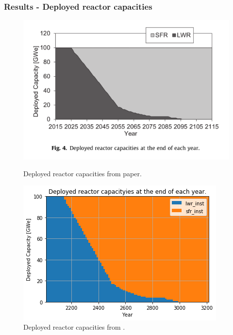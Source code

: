 \begin{frame}
    \frametitle{Results - Deployed reactor capacities}
    \begin{figure}[htbp!]
        \begin{minipage}[b]{.45\linewidth}
            \begin{center}
                \includegraphics[width=\textwidth]{./images/literature/power_plot.png}
            \end{center}
            \caption{Deployed reactor capacities from paper. \footnotemark}
        \end{minipage}
        \hspace{.5cm}
        \begin{minipage}[b]{.45\linewidth}
            \centering
                \includegraphics[width=\linewidth]{./images/results/power_plot.png}
            \caption{Deployed reactor capacities from \Cyclus.}
        \end{minipage}
    \end{figure}
\end{frame}


